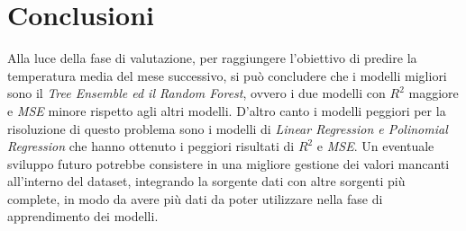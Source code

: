 \documentclass[12pt, a4paper, twocolumn]{article} %
\begin{document}
\section{Conclusioni}
Alla luce della fase di valutazione, per raggiungere l'obiettivo di predire la temperatura media del mese successivo, si può concludere che i modelli migliori sono il \textit{Tree Ensemble ed il Random Forest}, ovvero i due modelli con $R^{2}$ maggiore e \textit{MSE} minore rispetto agli altri modelli. D'altro canto i modelli peggiori per la risoluzione di questo problema sono i modelli di \textit{Linear Regression e Polinomial Regression} che hanno ottenuto i peggiori risultati di $R^{2}$ e \textit{MSE}. Un eventuale sviluppo futuro potrebbe consistere in una migliore gestione dei valori mancanti all'interno del dataset, integrando la sorgente dati con altre sorgenti più complete, in modo da avere più dati da poter utilizzare nella fase di apprendimento dei modelli.

\printbibliography[title={Bibliografia}] %
\end{document}
